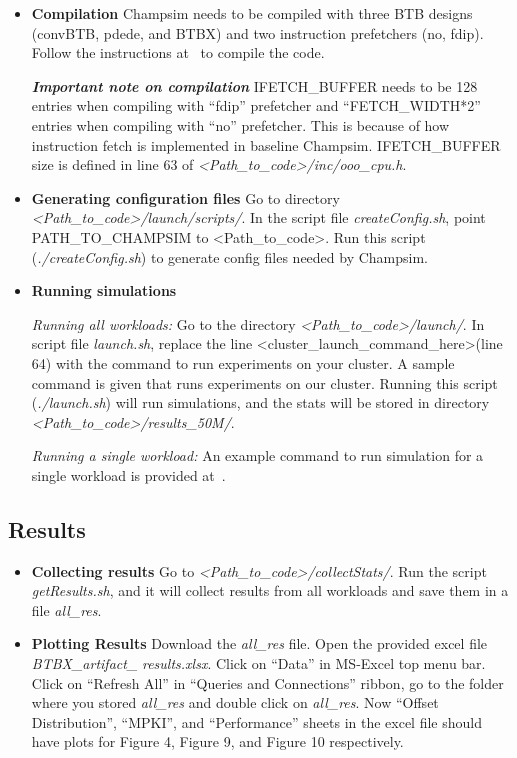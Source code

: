 \begin{itemize}
\item \textbf{Compilation} Champsim needs to be compiled with three BTB designs (convBTB, pdede, and BTBX) and two instruction prefetchers (no, fdip). Follow the instructions at~\cite{btbx-artifacts} to compile the code.


\textbf{\textit{Important note on compilation}} IFETCH\_BUFFER needs to be 128 entries when compiling with “fdip” prefetcher and “FETCH\_WIDTH*2” entries when compiling with “no” prefetcher. This is because of how instruction fetch is implemented in baseline Champsim. IFETCH\_BUFFER size is defined in line 63 of \emph{\textless Path\_to\_code\textgreater/inc/ooo\_cpu.h}.

\item \textbf{Generating configuration files}
Go to directory \emph{\textless Path\_to\_code\textgreater/launch/scripts/}. In the script file \emph{createConfig.sh}, point PATH\_TO\_CHAMPSIM to \textless Path\_to\_code\textgreater. Run this script (\emph{./createConfig.sh}) to generate config files needed by Champsim.

\item \textbf{Running simulations}

\noindent \textit{Running all workloads:} Go to the directory \emph{\textless Path\_to\_code\textgreater/launch/}. In script file \emph{launch.sh}, replace the line \textless cluster\_launch\_command\_here\textgreater (line 64) with the command to run experiments on your cluster. A sample command is given that runs experiments on our cluster. Running this script (\emph{./launch.sh}) will run simulations, and the stats will be stored in directory \emph{\textless Path\_to\_code\textgreater/results\_50M/}.

\noindent \textit{Running a single workload:} An example command to run simulation for a single workload is provided at~\cite{btbx-artifacts}.

\end{itemize}

\subsection{Results}
\begin{itemize}
\item \textbf{Collecting results}
Go to \emph{\textless Path\_to\_code\textgreater/collectStats/}. Run the script \emph{get}\emph{Results.sh}, and it will collect results from all workloads and save them in a file \emph{all\_res}.

\item \textbf{Plotting Results}
Download the \emph{all\_res} file. Open the provided excel file \emph{BTBX\_artifact\_} \emph{results.xlsx}. Click on “Data” in MS-Excel top menu bar. Click on “Refresh All” in “Queries and Connections” ribbon, go to the folder where you stored \emph{all\_res} and double click on \emph{all\_res}. Now “Offset Distribution”, “MPKI”, and “Performance” sheets in the excel file should have plots for Figure 4, Figure 9, and Figure 10 respectively.
\end{itemize}
